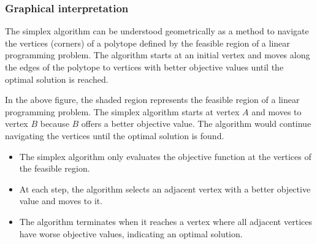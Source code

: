 \subsubsection{Graphical interpretation}
The simplex algorithm can be understood geometrically as a 
method to navigate the vertices (corners) of a polytope 
defined by the feasible region of a linear programming problem. 
The algorithm starts at an initial vertex and moves along 
the edges of the polytope to vertices with better objective 
values until the optimal solution is reached.
\begin{center}
\end{center}

In the above figure, the shaded region represents 
the feasible region of a linear programming problem. 
The simplex algorithm starts at vertex \(A\) and moves to 
vertex \(B\) because \(B\) offers a better objective value. 
The algorithm would continue navigating the vertices until 
the optimal solution is found.
\begin{itemize}
    \item The simplex algorithm only evaluates the objective 
    function at the vertices of the feasible region.
    \item At each step, the algorithm selects an adjacent 
    vertex with a better objective value and moves to it.
    \item The algorithm terminates when it reaches a vertex where 
    all adjacent vertices have worse objective values, indicating an 
    optimal solution.
\end{itemize}
